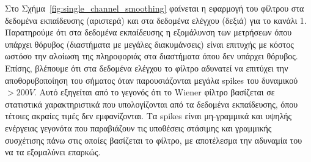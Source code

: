\documentclass[a4paper,12pt]{article}
\begin{document}
Στο Σχήμα~\ref{fig:single_channel_smoothing} φαίνεται η εφαρμογή του φίλτρου στα δεδομένα εκπαίδευσης 
(αριστερά) και στα δεδομένα ελέγχου (δεξιά) για το κανάλι 1. Παρατηρούμε ότι στα δεδομένα εκπαίδευσης η
εξομάλυνση των μετρήσεων όπου υπάρχει θόρυβος (διαστήματα με μεγάλες διακυμάνσεις) είναι επιτυχής με
κόστος ωστόσο την αλοίωση της πληροφοριάς στα διαστήματα όπου δεν υπάρχει θόρυβος. Επίσης, βλέπουμε ότι
στα δεδομένα ελέγχου το φίλτρο αδυνατεί να επιτύχει την αποθορυβοποίηση του σήματος όταν παρουσιάζονται
μεγάλα spikes του δυναμικού $> 200 V$. Αυτό εξηγείται από
το γεγονός ότι το Wiener φίλτρο βασίζεται σε στατιστικά 
χαρακτηριστικά που υπολογίζονται από τα δεδομένα εκπαίδευσης, όπου τέτοιες ακραίες τιμές δεν εμφανίζονται. 
Τα spikes είναι μη-γραμμικά και υψηλής 
ενέργειας γεγονότα που παραβιάζουν τις υποθέσεις στάσιμης και γραμμικής συσχέτισης πάνω στις οποίες 
βασίζεται το φίλτρο, με αποτέλεσμα την αδυναμία του να τα εξομαλύνει επαρκώς.
\end{document}
